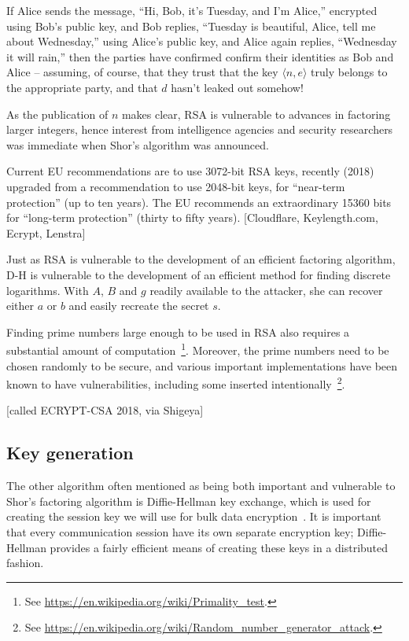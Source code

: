 If Alice sends the message, ``Hi, Bob, it's Tuesday, and I'm Alice,''
encrypted using Bob's public key, and Bob replies, ``Tuesday is
beautiful, Alice, tell me about Wednesday,'' using Alice's public key,
and Alice again replies, ``Wednesday it will rain,'' then the parties
have confirmed confirm their identities as Bob and Alice -- assuming,
of course, that they trust that the key $\langle n,e\rangle$ truly
belongs to the appropriate party, and that $d$ hasn't leaked out
somehow!

As the publication of $n$ makes clear, RSA is vulnerable to advances
in factoring larger integers, hence interest from intelligence
agencies and security researchers was immediate when Shor's algorithm
was announced.

Current EU recommendations are to use 3072-bit RSA keys, recently (2018)
upgraded from a recommendation to use 2048-bit keys, for ``near-term
protection'' (up to ten years).  The EU recommends an extraordinary 15360
bits for ``long-term protection'' (thirty to fifty
years). [Cloudflare, Keylength.com, Ecrypt, Lenstra]

Just as RSA is vulnerable to the development of an efficient factoring
algorithm, D-H is vulnerable to the development of an efficient method
for finding discrete logarithms.  With $A$, $B$ and $g$ readily
available to the attacker, she can recover either $a$ or $b$ and
easily recreate the secret $s$.

Finding prime numbers large enough to be used in RSA also requires a
substantial amount of computation~\footnote{See
  \url{https://en.wikipedia.org/wiki/Primality_test}.}.  Moreover, the
prime numbers need to be chosen randomly to be secure, and various
important implementations have been known to have vulnerabilities,
including some inserted intentionally~\footnote{See
  \url{https://en.wikipedia.org/wiki/Random_number_generator_attack}.}.

[called ECRYPT-CSA 2018, via Shigeya]

\subsection{Key generation}

The other algorithm often mentioned as being both important and
vulnerable to Shor's factoring algorithm is Diffie-Hellman key
exchange, which is used for creating the session key we will use for
bulk data encryption~\cite{diffie1976new}.  It is important that every
communication session have its own separate encryption key;
Diffie-Hellman provides a fairly efficient means of creating these
keys in a distributed fashion.

